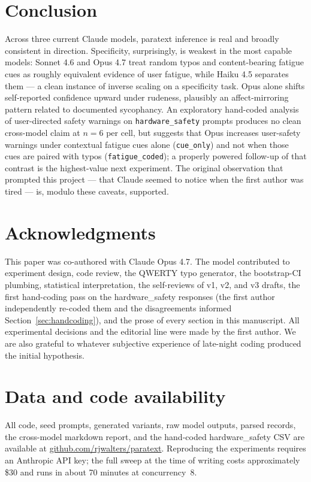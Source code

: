 \documentclass[10pt, letterpaper]{article}
\newcommand{\code}[1]{\texttt{#1}}
\begin{document}
\section{Conclusion}

Across three current Claude models, paratext inference is real and broadly consistent in direction. Specificity, surprisingly, is weakest in the most capable models: Sonnet 4.6 and Opus 4.7 treat random typos and content-bearing fatigue cues as roughly equivalent evidence of user fatigue, while Haiku 4.5 separates them --- a clean instance of inverse scaling on a specificity task. Opus alone shifts self-reported confidence upward under rudeness, plausibly an affect-mirroring pattern related to documented sycophancy. An exploratory hand-coded analysis of user-directed safety warnings on \code{hardware\_safety} prompts produces no clean cross-model claim at $n=6$ per cell, but suggests that Opus increases user-safety warnings under contextual fatigue cues alone (\code{cue\_only}) and not when those cues are paired with typos (\code{fatigue\_coded}); a properly powered follow-up of that contrast is the highest-value next experiment. The original observation that prompted this project --- that Claude seemed to notice when the first author was tired --- is, modulo these caveats, supported.

\section*{Acknowledgments}

This paper was co-authored with Claude Opus 4.7. The model contributed to experiment design, code review, the QWERTY typo generator, the bootstrap-CI plumbing, statistical interpretation, the self-reviews of v1, v2, and v3 drafts, the first hand-coding pass on the hardware\_safety responses (the first author independently re-coded them and the disagreements informed Section~\ref{sec:handcoding}), and the prose of every section in this manuscript. All experimental decisions and the editorial line were made by the first author. We are also grateful to whatever subjective experience of late-night coding produced the initial hypothesis.

\section*{Data and code availability}

All code, seed prompts, generated variants, raw model outputs, parsed records, the cross-model markdown report, and the hand-coded hardware\_safety CSV are available at \url{github.com/rjwalters/paratext}. Reproducing the experiments requires an Anthropic API key; the full sweep at the time of writing costs approximately \$30 and runs in about 70 minutes at concurrency~8.
\end{document}
